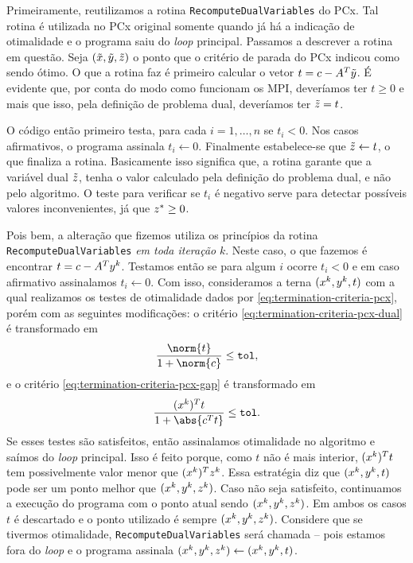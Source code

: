 Primeiramente,  reutilizamos a rotina \verb|RecomputeDualVariables| do PCx. Tal rotina  é utilizada no PCx original somente quando já há a indicação de otimalidade e o programa saiu do \emph{loop} principal. Passamos a descrever  a rotina em questão. Seja $(\tilde{x},\tilde{y},\tilde{z})$ o ponto que o critério de parada do PCx indicou como sendo ótimo. O que a rotina faz é primeiro calcular o vetor  $t= c - A^T\tilde{y}$. É evidente que, por conta do modo como funcionam os \ac{MPI}, deveríamos ter $t\geq0$ e mais que isso, pela definição de problema dual, deveríamos ter $\tilde{z} = t$. 

 O código então primeiro testa, para cada  $i = 1,\ldots,n$ se $t_{i}<0$.  Nos casos afirmativos, o programa assinala $t_{i}\leftarrow 0$. Finalmente estabelece-se que  $\tilde{z} \leftarrow t $, o que finaliza a rotina. Basicamente isso significa que, a rotina garante que a variável dual $\tilde{z}$, tenha o valor calculado pela definição do problema dual, e não pelo algoritmo. O teste para verificar se $t_{i}$ é negativo serve para detectar possíveis valores inconvenientes, já que $z^*\geq 0$.

 Pois bem, a alteração que fizemos utiliza os princípios da rotina   \verb|RecomputeDualVariables| \emph{em toda iteração} $k$. Neste caso, o que fazemos é encontrar $t= c - A^Ty^{k}$. Testamos então se para algum  $i$ ocorre $t_{i}<0$ e em caso afirmativo assinalamos $t_{i}\leftarrow 0$. Com isso, consideramos a terna $(x^{k},y^{k},t)$ com a qual realizamos os testes de otimalidade dados por
 \eqref{eq:termination-criteria-pcx}, porém com as seguintes modificações: o critério \eqref{eq:termination-criteria-pcx-dual} é transformado em
\[\dfrac{\norm{t}}{1 + \norm{c}} \leq \tol,\]	
e o critério  \eqref{eq:termination-criteria-pcx-gap} é transformado em 
\[
	\dfrac{(\xk)^{T}t}{1 + \abs{c^Tt}}\leq\tol.
\]
Se esses testes são satisfeitos, então assinalamos otimalidade no algoritmo e saímos do \emph{loop} principal. 
Isso é feito porque,  como $t$ não é mais interior, $(x^{k})^{T}t$ tem possivelmente valor menor que $(x^{k})^{T}z^{k}$. Essa estratégia diz que $(x^{k},y^{k},t)$ pode ser um ponto melhor que $(x^{k},y^{k},z^{k})$.  Caso não seja satisfeito, continuamos a execução do programa com o ponto atual sendo $(x^{k},y^{k},z^{k})$. Em ambos os casos $t$ é descartado e o ponto utilizado é sempre $(x^{k},y^{k},z^{k})$. Considere que se tivermos otimalidade, \verb|RecomputeDualVariables| será chamada -- pois estamos fora do \emph{loop} e o programa assinala $(x^{k},y^{k},z^{k})\leftarrow (x^{k},y^{k},t)$. 

